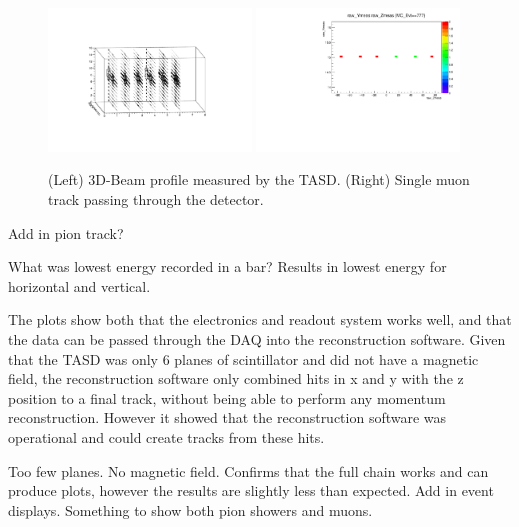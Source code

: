 \begin{figure}[h!]
\centering
\includegraphics[width=0.48\textwidth,trim = 5cm 5cm 5cm 5cm]{figures/nuphys/newFigures/beamPlot.pdf}
\includegraphics[width=0.48\textwidth]{figures/nuphys/newFigures/muonTrackYZ.pdf}
\caption{(Left) 3D-Beam profile measured by the TASD. (Right) Single muon track passing through the detector.}
\label{fig:TASDres1}
\end{figure}

Add in pion track?

What was lowest energy recorded in a bar? Results in lowest energy for horizontal and vertical.

The plots show both that the electronics and readout system works well, and that the data can be passed through the DAQ into the reconstruction software. Given that the TASD was only 6 planes of scintillator and did not have a magnetic field, the reconstruction software only combined hits in x and y with the z position to a final track, without being able to perform any momentum reconstruction. However it showed that the reconstruction software was operational and could create tracks from these hits.

Too few planes. No magnetic field. Confirms that the full chain works and can produce plots, however the results are slightly less than expected. Add in event displays. Something to show both pion showers and muons.


